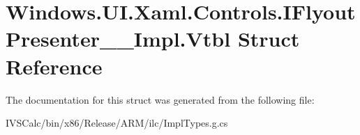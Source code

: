\hypertarget{struct_windows_1_1_u_i_1_1_xaml_1_1_controls_1_1_i_flyout_presenter_____impl_1_1_vtbl}{}\section{Windows.\+U\+I.\+Xaml.\+Controls.\+I\+Flyout\+Presenter\+\_\+\+\_\+\+Impl.\+Vtbl Struct Reference}
\label{struct_windows_1_1_u_i_1_1_xaml_1_1_controls_1_1_i_flyout_presenter_____impl_1_1_vtbl}


The documentation for this struct was generated from the following file\+:\begin{DoxyCompactItemize}
\item 
I\+V\+S\+Calc/bin/x86/\+Release/\+A\+R\+M/ilc/Impl\+Types.\+g.\+cs\end{DoxyCompactItemize}
